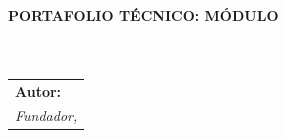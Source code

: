 


\sffamily
{\color{WasaffCopper} \large \textbf{PORTAFOLIO TÉCNICO: MÓDULO \moduleNumber}}\\
\
{\color{WasaffNavy} \huge \textbf{\moduleTitle}}\\
\
{\Large \moduleSubtitle}\\
\vspace{1cm}
\rmfamily
\begin{tabular}{@{}p{14cm}}
    \textbf{Autor:} \consultingAuthor \\
    \textit{Fundador, \consultingCompany} \\
\end{tabular}
\
\hrulefill
\
\tableofcontents
\
\hrulefill
\
\newpage


\clearpage 


\newpage




